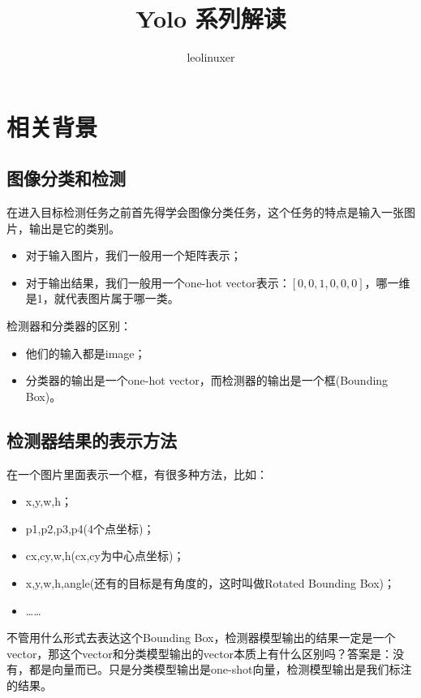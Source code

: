 \documentclass[12pt]{article}
\title{Yolo 系列解读\cite{Yolo_From_V1_To_V5_1}}
\author{leolinuxer}
\begin{document}
\maketitle
\tableofcontents

\section{相关背景}
\subsection{图像分类和检测}
在进入目标检测任务之前首先得学会图像分类任务，这个任务的特点是输入一张图片，输出是它的类别。
\begin{itemize}
\setlength{\itemsep}{0pt}
\setlength{\parsep}{0pt}
\setlength{\parskip}{0pt}
    \item 对于输入图片，我们一般用一个矩阵表示；
    \item 对于输出结果，我们一般用一个one-hot vector表示：$[0, 0, 1, 0, 0, 0]$，哪一维是1，就代表图片属于哪一类。
\end{itemize}

检测器和分类器的区别：
\begin{itemize}
\setlength{\itemsep}{0pt}
\setlength{\parsep}{0pt}
\setlength{\parskip}{0pt}
    \item 他们的输入都是image；
    \item 分类器的输出是一个one-hot vector，而检测器的输出是一个框(Bounding Box)。
\end{itemize}

\subsection{检测器结果的表示方法}
在一个图片里面表示一个框，有很多种方法，比如：
\begin{itemize}
\setlength{\itemsep}{0pt}
\setlength{\parsep}{0pt}
\setlength{\parskip}{0pt}
    \item x,y,w,h；
    \item p1,p2,p3,p4(4个点坐标)；
    \item cx,cy,w,h(cx,cy为中心点坐标)；
    \item x,y,w,h,angle(还有的目标是有角度的，这时叫做Rotated Bounding Box)；
    \item ……
\end{itemize}

不管用什么形式去表达这个Bounding Box，检测器模型输出的结果一定是一个vector，那这个vector和分类模型输出的vector本质上有什么区别吗？答案是：没有，都是向量而已。只是分类模型输出是one-shot向量，检测模型输出是我们标注的结果。
\end{document}
